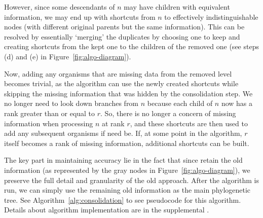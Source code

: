 However, since some descendants of $n$ may have children with equivalent information, we may end up with shortcuts from $n$ to effectively indistinguishable nodes (with different original parents but the same information).
This can be resolved by essentially `merging' the duplicates by choosing one to keep and creating shortcuts from the kept one to the children of the removed one (see steps (d) and (e) in Figure~\ref{fig:algo-diagram}).

Now, adding any organisms that are missing data from the removed level becomes trivial, as the algorithm can use the newly created shortcuts while skipping the missing information that was hidden by the consolidation step.
We no longer need to look down branches from $n$ because each child of $n$ now has a rank greater than or equal to $r$. So, there is no longer a concern of missing information when processing $n$ at rank $r$, and these shortcuts are then used to add any subsequent organisms if need be.
If, at some point in the algorithm, $r$ itself becomes a rank of missing information, additional shortcuts can be built.



The key part in maintaining accuracy lie in the fact that since retain the old information (as represented by the gray nodes in Figure~\ref{fig:algo-diagram}), we preserve the full detail and granularity of the old approach. After the algorithm is run, we can simply use the remaining old information as the main phylogenetic tree. See Algorithm~\ref{alg:consolidation} to see pseudocode for this algorithm. Details about algorithm implementation are in the supplemental \citep{supplemental}.
